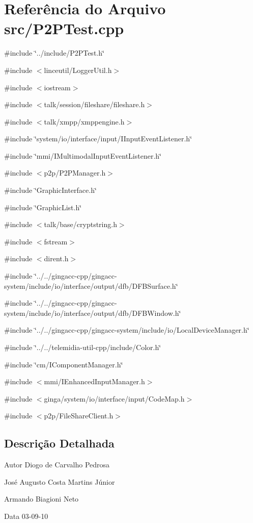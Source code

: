 \section{Referência do Arquivo src/P2PTest.cpp}
\label{P2PTest_8cpp}
{\ttfamily \#include \char`\"{}../include/P2PTest.h\char`\"{}}\par
{\ttfamily \#include $<$linceutil/LoggerUtil.h$>$}\par
{\ttfamily \#include $<$iostream$>$}\par
{\ttfamily \#include $<$talk/session/fileshare/fileshare.h$>$}\par
{\ttfamily \#include $<$talk/xmpp/xmppengine.h$>$}\par
{\ttfamily \#include \char`\"{}system/io/interface/input/IInputEventListener.h\char`\"{}}\par
{\ttfamily \#include \char`\"{}mmi/IMultimodalInputEventListener.h\char`\"{}}\par
{\ttfamily \#include $<$p2p/P2PManager.h$>$}\par
{\ttfamily \#include \char`\"{}GraphicInterface.h\char`\"{}}\par
{\ttfamily \#include \char`\"{}GraphicList.h\char`\"{}}\par
{\ttfamily \#include $<$talk/base/cryptstring.h$>$}\par
{\ttfamily \#include $<$fstream$>$}\par
{\ttfamily \#include $<$dirent.h$>$}\par
{\ttfamily \#include \char`\"{}../../gingacc-\/cpp/gingacc-\/system/include/io/interface/output/dfb/DFBSurface.h\char`\"{}}\par
{\ttfamily \#include \char`\"{}../../gingacc-\/cpp/gingacc-\/system/include/io/interface/output/dfb/DFBWindow.h\char`\"{}}\par
{\ttfamily \#include \char`\"{}../../gingacc-\/cpp/gingacc-\/system/include/io/LocalDeviceManager.h\char`\"{}}\par
{\ttfamily \#include \char`\"{}../../telemidia-\/util-\/cpp/include/Color.h\char`\"{}}\par
{\ttfamily \#include \char`\"{}cm/IComponentManager.h\char`\"{}}\par
{\ttfamily \#include $<$mmi/IEnhancedInputManager.h$>$}\par
{\ttfamily \#include $<$ginga/system/io/interface/input/CodeMap.h$>$}\par
{\ttfamily \#include $<$p2p/FileShareClient.h$>$}\par


\subsection{Descrição Detalhada}
\begin{DoxyAuthor}{Autor}
Diogo de Carvalho Pedrosa 

José Augusto Costa Martins Júnior 

Armando Biagioni Neto 
\end{DoxyAuthor}
\begin{DoxyDate}{Data}
03-\/09-\/10 
\end{DoxyDate}
